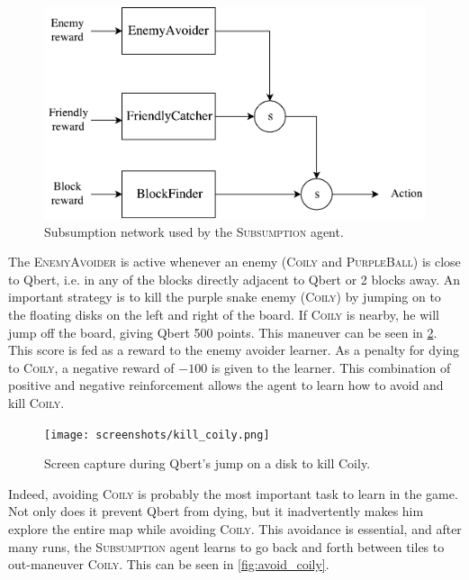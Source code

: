 \documentclass[a4paper,titlepage]{article}
\begin{document}
	\begin{figure}[!htb]
		\centering
		\includegraphics[width=\columnwidth]{plots/subsumption.pdf}
		\caption
		{Subsumption network used by the \textsc{Subsumption} agent.}
		\label{fig:subsumption}
	\end{figure}

	The \textsc{EnemyAvoider} is active whenever an enemy (\textsc{Coily} and \textsc{PurpleBall}) is close to Qbert, i.e. in any of the blocks directly adjacent to Qbert or 2 blocks away. An important strategy is to kill the purple snake enemy (\textsc{Coily}) by jumping on to the floating disks on the left and right of the board. If \textsc{Coily} is nearby, he will jump off the board, giving Qbert 500 points. This maneuver can be seen in \cref{fig:kill_coily}. This score is fed as a reward to the enemy avoider learner. As a penalty for dying to \textsc{Coily}, a negative reward of $-100$ is given to the learner. This combination of positive and negative reinforcement allows the agent to learn how to avoid and kill \textsc{Coily}.
	
	\begin{figure}[!htb]
		\centering
		\texttt{[image: screenshots/kill\_coily.png]}
		\caption
		{Screen capture during Qbert's jump on a disk to kill Coily.}
		\label{fig:kill_coily}
	\end{figure}

	Indeed, avoiding \textsc{Coily} is probably the most important task to learn in the game. Not only does it prevent Qbert from dying, but it inadvertently makes him explore the entire map while avoiding \textsc{Coily}. This avoidance is essential, and after many runs, the \textsc{Subsumption} agent learns to go back and forth between tiles to out-maneuver \textsc{Coily}. This can be seen in \cref{fig:avoid_coily}.
	
\end{document}
